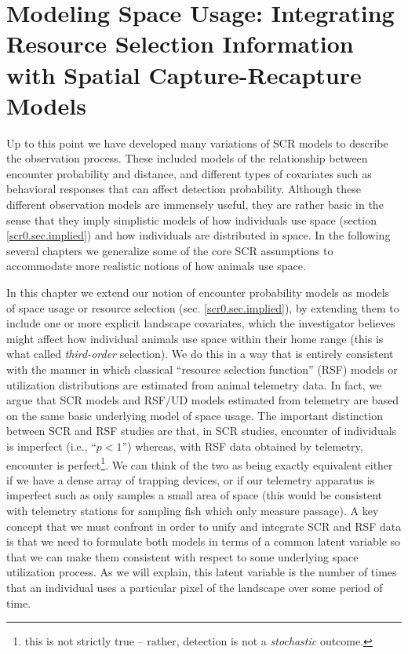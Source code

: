 \chapter{
Modeling Space Usage:
Integrating Resource Selection Information with
Spatial Capture-Recapture
  Models}

\label{chapt.rsf}


\vspace{.3in}

Up to this point we have developed many variations of SCR models to
describe the observation process.  These included models of the
relationship between encounter probability and distance, and different
types of covariates such as behavioral responses that can affect
detection probability.  Although these different observation models
are immensely useful, they are rather basic in the sense that they
imply simplistic models of how individuals use space (section
\ref{scr0.sec.implied}) and how individuals are distributed in space.
In the following several chapters we generalize some of the core SCR
assumptions to accommodate more realistic notions of how animals use
space.


In this chapter we extend our notion of encounter probability models
as models of space usage or resource selection
(sec. \ref{scr0.sec.implied}), by extending them to include one or
more explicit landscape covariates, which the investigator believes
might affect how individual animals use space within their home range
(this is what \citep{johnson:1980} called {\it third-order}
selection). We do this in a way that is entirely consistent with the
manner in which classical ``resource selection function'' (RSF) models
\citep{manly_etal:2002} or utilization distributions
\citep{worton:1989, fieberg:2005, fieberg:2007} are estimated from
animal telemetry data.  In fact, we argue that SCR models and
RSF/UD models estimated from telemetry are based on the same basic
underlying model of space usage. The important distinction between SCR
and RSF studies are that, in SCR studies, encounter of individuals is
imperfect (i.e., ``$p<1$'') whereas, with RSF data obtained by
telemetry, encounter is perfect\footnote{this is not strictly true --
  rather, detection is not a {\it stochastic} outcome.}. We can think
of the two as being exactly equivalent either if we have a dense array
of trapping devices, or if our telemetry apparatus is imperfect such
as only samples a small area of space (this would be consistent with
telemetry stations for sampling fish which only measure passage).
A
key concept that we must confront in order to unify and integrate SCR
and RSF data is that we need to formulate both models in terms of a
common latent variable so that we can make them consistent with
respect to some underlying space utilization process. As we will
explain, this latent variable is the number of times that an
individual uses a particular pixel of the landscape over some period
of time.

